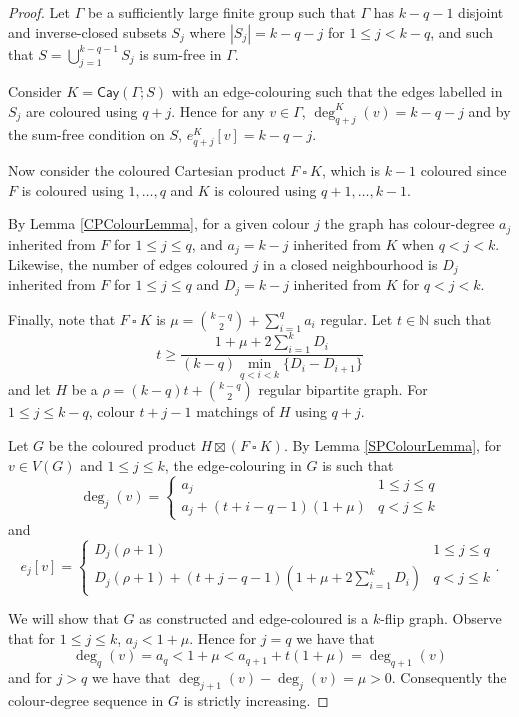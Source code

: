 \documentclass[10pt,a4paper]{amsart}
\newcommand{\cay}[2]{\mathsf{Cay}\left(#1 ; #2\right)}
\begin{document}
\begin{proof}
Let $\Gamma$ be a sufficiently large finite group such that $\Gamma$ has $k - q - 1$ disjoint and inverse-closed subsets $S_j$ where $|S_j| = k - q - j$ for $1 \leq j < k - q$, and such that $S = \bigcup\limits_{j = 1}^{k - q - 1} S_j$ is sum-free in $\Gamma$. 

Consider $K = \cay{\Gamma}{S}$ with an edge-colouring such that the edges labelled in $S_j$ are coloured using $q + j$. Hence for any $v \in \Gamma$, $\deg_{q+j}^K (v) = k - q - j$ and by the sum-free condition on $S$, $e_{q+j}^K [v] = k - q - j$.

Now consider the coloured Cartesian product $F \ \square \ K$, which is $k - 1$ coloured since $F$ is coloured using $1, \dots, q$ and $K$ is coloured using $q + 1, \dots, k - 1$. 

By Lemma \ref{CPColourLemma}, for a given colour $j$ the graph has colour-degree $a_j$ inherited from $F$ for $1 \leq j \leq q$, and $a_j = k - j$ inherited from $K$ when $q < j < k$. Likewise, the number of edges coloured $j$ in a closed neighbourhood is $D_j$ inherited from $F$ for $1 \leq j \leq q$ and $D_j = k - j$ inherited from $K$ for $q < j < k$. 

Finally, note that $F \ \square \ K$ is $\mu = \binom{k-q}{2} + \sum\limits_{i = 1}^q a_i$ regular. Let $t \in \mathbb{N}$ such that $$t \geq \dfrac{1 + \mu + 2\sum\limits_{i = 1}^k D_i}{(k-q)\min\limits_{q < i < k}\{D_i - D_{i+1}\}}$$ and let $H$ be a $\rho = (k-q)t + \binom{k-q}{2}$ regular bipartite graph. For $1 \leq j \leq k - q$, colour $t + j - 1$ matchings of $H$ using $q + j$. 

Let $G$ be the coloured product $H \boxtimes (F \ \square \ K)$. By Lemma \ref{SPColourLemma}, for $v \in V(G)$ and $1 \leq j \leq k$, the edge-colouring in $G$ is such that $$\deg_j (v) = 
\begin{cases} 
a_j & 1 \leq j \leq q \\
a_j + (t + i - q - 1)(1 + \mu)& q < j \leq k
\end{cases}
$$ and $$e_j [v] = \begin{cases} 
D_j (\rho + 1) & 1 \leq j \leq q \\
D_j (\rho + 1) + (t + j - q - 1)\left(1 + \mu + 2\sum\limits_{i=1}^k D_i\right)& q < j \leq k
\end{cases}.
$$

We will show that $G$ as constructed and edge-coloured is a $k$-flip graph. Observe that for $1 \leq j \leq k$, $a_j < 1 + \mu$. Hence for $j = q$ we have that $$\deg_q (v) = a_q < 1 + \mu < a_{q+1} + t(1 + \mu) = \deg_{q+1} (v)$$ and for $j > q$ we have that $\deg_{j+1} (v) - \deg_j (v) = \mu > 0$. Consequently the colour-degree sequence in $G$ is strictly increasing.


\end{proof}
\end{document}
